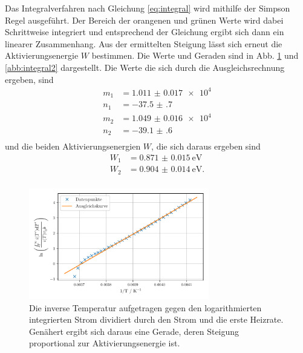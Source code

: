 Das Integralverfahren nach Gleichung \eqref{eq:integral} wird mithilfe der Simpson Regel ausgeführt. Der Bereich der orangenen und grünen Werte wird dabei Schrittweise integriert und entsprechend der Gleichung ergibt sich dann ein linearer Zusammenhang.
Aus der ermittelten Steigung lässt sich erneut die Aktivierungsenergie $W$ bestimmen. Die Werte und Geraden sind in Abb. \ref{abb:integral1} und \ref{abb:integral2} dargestellt. Die Werte die sich durch die Ausgleichsrechnung ergeben, sind 
\begin{align*}
    m_{1} &= \num{1.011(17)e4} \\
    n_{1} &= \num{-37.5(7)} \\
    m_{2} &= \num{1.049(16)e4} \\
    n_{2} &= \num{-39.1(6)} \\
\end{align*}
und die beiden Aktivierungsenergien $W$, die sich daraus ergeben sind 
\begin{align*}
    W_{1} &= \SI{0.871(15)}{\electronvolt} \\
    W_{2} &= \SI{0.904(14)}{\electronvolt}. \\
\end{align*}

\begin{figure}
    \centering
    \includegraphics[width=0.7\textwidth]{figures/integral1.pdf}
    \caption{Die inverse Temperatur aufgetragen gegen den logarithmierten integrierten Strom dividiert durch den Strom und die erste Heizrate. Genähert ergibt sich daraus eine Gerade, deren Steigung proportional zur Aktivierungsenergie ist.}
    \label{abb:integral1}
\end{figure}

